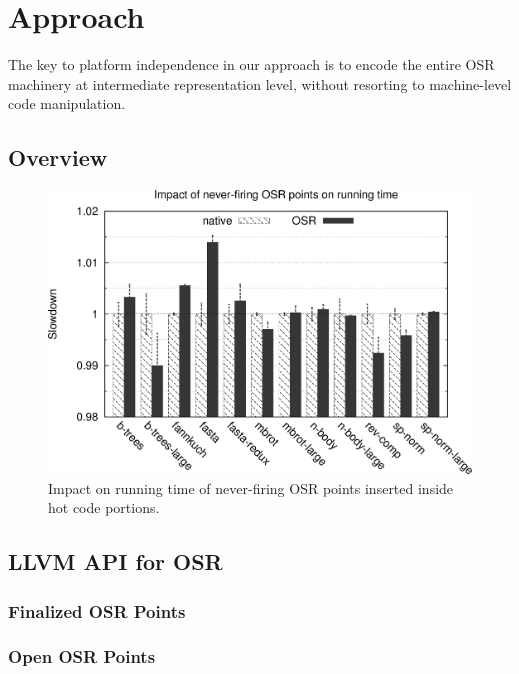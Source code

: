\section{Approach}
\label{se:approach}

The key to platform independence in our approach is to encode the entire OSR machinery at intermediate representation level, without resorting to machine-level code manipulation.

\subsection{Overview}

\begin{figure}
\begin{center}
\includegraphics[width=0.7\columnwidth]{figures/code-quality-noBB/code-quality-noBB.png}
\caption{\label{fig:code-quality2} Impact on running time of never-firing OSR points inserted inside hot code portions.}
\end{center}
\end{figure}

%
%

\subsection{LLVM API for OSR}

\subsubsection{Finalized OSR Points}

\subsubsection{Open OSR Points}


  
  
  
  
  
  
  
  
  
  
  
  
  
  
  
  
  
  